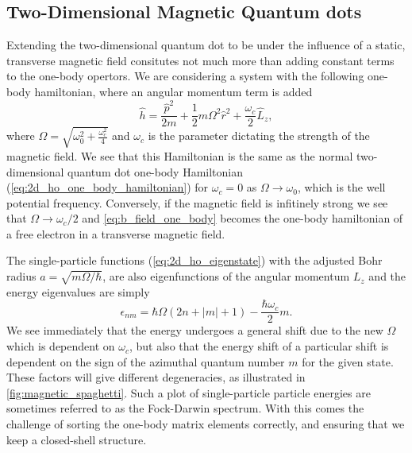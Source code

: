 \subsection{Two-Dimensional Magnetic Quantum dots}

Extending the two-dimensional quantum dot to be under the influence of a 
static, transverse magnetic field consitutes not much more than adding constant 
terms to the one-body opertors. We are considering a system with 
the following one-body hamiltonian, where an angular momentum term is added
\begin{equation}
    \label{eq:b_field_one_body}
    \hat{h} = \frac{\hat{p}^2}{2m} + \frac{1}{2}m\Omega^2\hat{r}^2 
        + \frac{\omega_c}{2}\hat{L}_z,   
\end{equation}
where $\Omega = \sqrt{\omega_0^2 + \frac{\omega_c^2}{4}}$ and $\omega_c$ is the 
parameter dictating the strength of the magnetic field. We see that this Hamiltonian
is the same as the normal two-dimensional quantum dot one-body Hamiltonian 
(\autoref{eq:2d_ho_one_body_hamiltonian}) for $\omega_c = 0$ as $\Omega \to \omega_0$,
which is the well potential frequency. Conversely, if the 
magnetic field is infitinely strong we see that $\Omega \to \omega_c/2$ and 
\autoref{eq:b_field_one_body} becomes the one-body hamiltonian of a free electron in 
a transverse magnetic field.

\begin{figure}[h]

\end{figure}

The single-particle functions 
(\autoref{eq:2d_ho_eigenstate}) with the adjusted Bohr radius $a=\sqrt{m\Omega/\hbar}$,
are also eigenfunctions of the angular momentum
$L_z$ and the energy eigenvalues are simply
\begin{equation}
    \label{eq:2d_b_eigenvalues}
    \epsilon_{nm} = \hbar\Omega(2n + |m| + 1) - \frac{\hbar\omega_c}{2}m.
\end{equation}
We see immediately that the energy undergoes a general shift due to the new $\Omega$
which is dependent on $\omega_c$, but also that the energy shift of a particular shift 
is dependent on the sign of the azimuthal quantum number $m$ for the given state. These 
factors will give different degeneracies, as illustrated in \autoref{fig:magnetic_spaghetti}.
Such a plot of single-particle particle energies are sometimes referred to as the 
Fock-Darwin spectrum\cite{fock1928bemerkung,darwin1931diamagnetism}.
With this comes the challenge of sorting the one-body matrix elements correctly, 
and ensuring that we keep a closed-shell structure.

